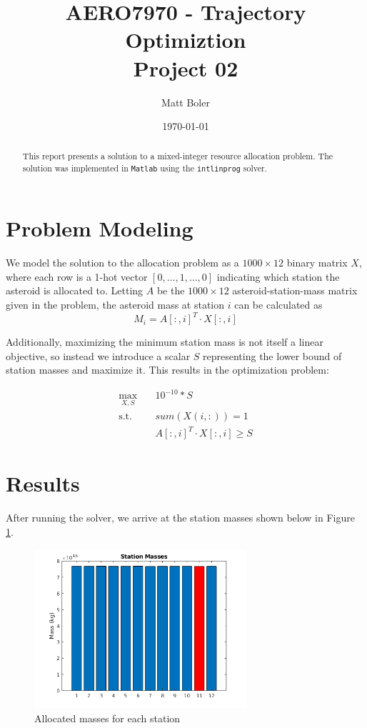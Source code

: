 \documentclass{article}
\title{AERO7970 - Trajectory Optimiztion \\ {\small Project 02}}
\author{Matt Boler}
\date{\today}
\begin{document}
\maketitle

\begin{abstract}
  This report presents a solution to a mixed-integer resource allocation problem.
  The solution was implemented in \texttt{Matlab} using the \texttt{intlinprog} solver.
\end{abstract}

\section{Problem Modeling}

We model the solution to the allocation problem as a $1000 \times 12$ binary matrix $X$, where each row is a 1-hot vector $[0, \dots, 1, \dots, 0]$ indicating which station the asteroid is allocated to.
Letting $A$ be the $1000 \times 12$ asteroid-station-mass matrix given in the problem, the asteroid mass at station $i$ can be calculated as
\[
  M_i = A[:, i]^T \cdot X[:, i]
\]

Additionally, maximizing the minimum station mass is not itself a linear objective, so instead we introduce a scalar $S$ representing the lower bound of station masses and maximize it.
This results in the optimization problem:

\begin{align*}
  \max_{X, S} \quad & 10^{-10} * S \\
  \textrm{s.t.} \quad & sum(X(i, :)) = 1 \\
  & A[:, i]^T \cdot X[:, i] \geq S
\end{align*}

\section{Results}

After running the solver, we arrive at the station masses shown below in Figure \ref{fig:masses}.

\begin{figure}[H]
  \centering
  \includegraphics[width=0.7\textwidth]{images/masses.png}
  \caption{Allocated masses for each station}
  \label{fig:masses}
\end{figure}
\end{document}
